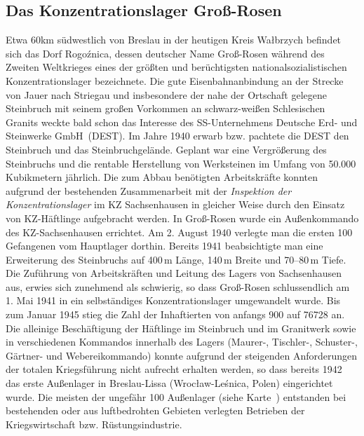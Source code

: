 \documentclass[a4paper,12pt,ngerman,
]{nisebook}
\begin{document}
\begin{fshaded}\vspace{-.5cm}\subsection*{Das Konzentrationslager Groß-Rosen}
Etwa 60km südwestlich von Breslau in der heutigen Kreis Wa\l brzych befindet sich das Dorf Rogo\'znica, dessen deutscher Name Groß-Rosen  während des Zweiten Weltkrieges eines der größten und berüchtigsten nationalsozialistischen Konzentrationslager bezeichnete. Die gute Eisenbahnanbindung an der Strecke von Jauer nach Striegau und insbesondere der nahe der Ortschaft gelegene Steinbruch mit seinem großen Vorkommen an schwarz-weißen Schlesischen Granits weckte bald schon das Interesse des SS-Unternehmens \glqq Deutsche Erd- und Steinwerke GmbH\grqq~\-(DEST). Im Jahre 1940 erwarb bzw. pachtete die DEST den Steinbruch und das Steinbruchgelände. Geplant war eine Vergrößerung des Steinbruchs und die rentable Herstellung von Werksteinen im Umfang von 50.000 Kubikmetern jährlich. Die zum Abbau benötigten Arbeitskräfte konnten aufgrund der bestehenden Zusammenarbeit mit der \emph{Inspektion der Konzentrationslager} im KZ Sachsenhausen in gleicher Weise durch den Einsatz von KZ-Häftlinge aufgebracht werden. In Groß-Rosen wurde ein Außenkommando des KZ-Sachsenhausen errichtet. Am 2. August 1940 verlegte man die ersten 100 Gefangenen vom Hauptlager dorthin. Bereits 1941 beabsichtigte man eine Erweiterung des Steinbruchs auf 400\,m Länge, 140\,m Breite und 70--80\,m Tiefe. Die Zuführung von Arbeitskräften und Leitung des Lagers von Sachsenhausen aus, erwies sich zunehmend als schwierig, so dass Groß-Rosen schlussendlich am 1. Mai 1941 in ein selbständiges Konzentrationslager umgewandelt wurde. Bis zum Januar 1945 stieg die Zahl der Inhaftierten von anfangs 900 auf 76728 an. Die alleinige Beschäftigung der Häftlinge im Steinbruch und im Granitwerk sowie in verschiedenen Kommandos innerhalb des Lagers (Maurer-, Tischler-, Schuster-, Gärtner- und Webereikommando) konnte aufgrund der steigenden Anforderungen der totalen Kriegsführung nicht aufrecht erhalten werden, so dass bereits 1942 das erste Außenlager in Breslau-Lissa (Wroc\l aw-Leśnica, Polen) eingerichtet wurde. Die meisten der ungefähr 100 Außenlager (siehe Karte~) entstanden bei bestehenden oder aus luftbedrohten Gebieten verlegten Betrieben der Kriegswirtschaft bzw. Rüstungsindustrie.

\end{fshaded}
\end{document}

